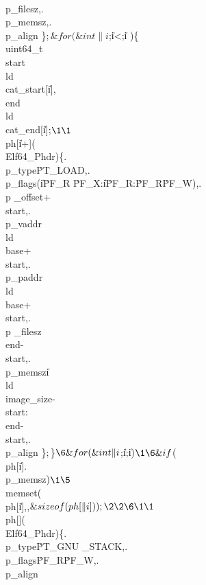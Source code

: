 \\{p\_filesz}\K{}$ $,$ $.$ $\\{p\_memsz}\K{}$ $,$ $.$ $\\{p\_align}%
\K{}$ $\}$  ; \&{for} (\&{int} \|i${}\K{};{}$ ${}\|i<;{}$ ${}\|i%
\PP)$ $\{$ $\\{uint64\_t}\\{start}\K\\{ld}\MG\\{cat\_start}[\|i],\\{end}\K%
\\{ld}\MG\\{cat\_end}[\|i];$ \1\1${}\\{ph}[\|i+]\K(\\{Elf64\_Phdr})$ $\{$
$.$ $\\{p\_type}\K\.{PT\_LOAD}$ $,$ $.$ $\\{p\_flags}\K(\|i\E{}\?\.{PF\_R}%
\OR\.{PF\_X}:\|i\E{}\?\.{PF\_R}:\.{PF\_R}\OR\.{PF\_W})$ $,$ $.$ $\\{p%
\_offset}\K{}+\\{start}$ $,$ $.$ $\\{p\_vaddr}\K\\{ld}\MG\\{base}+%
\\{start}$ $,$ $.$ $\\{p\_paddr}\K\\{ld}\MG\\{base}+\\{start}$ $,$ $.$ $\\{p%
\_filesz}\K\\{end}-\\{start}$ $,$ $.$ $\\{p\_memsz}\K\|i\E{}\?\\{ld}\MG%
\\{image\_size}-\\{start}:\\{end}-\\{start}$ $,$ $.$ $\\{p\_align}\K{}$ $%
\}$  ; $\}$ \6
\&{for} (\&{int} \|i${}\K{};{}$ ${}\|i\Z{};{}$ ${}\|i\PP){}$\1\6
\&{if} ${}(\\{ph}[\|i].\\{p\_memsz}\E{}){}$\1\5
${}\\{memset}({\AND}\\{ph}[\|i],,$\&{sizeof} (\\{ph}[\|i]));\2\2\6
\1\1${}\\{ph}[]\K(\\{Elf64\_Phdr})$ $\{$ $.$ $\\{p\_type}\K\.{PT\_GNU%
\_STACK}$ $,$ $.$ $\\{p\_flags}\K\.{PF\_R}\OR\.{PF\_W}$ $,$ $.$ $\\{p\_align}\K%
